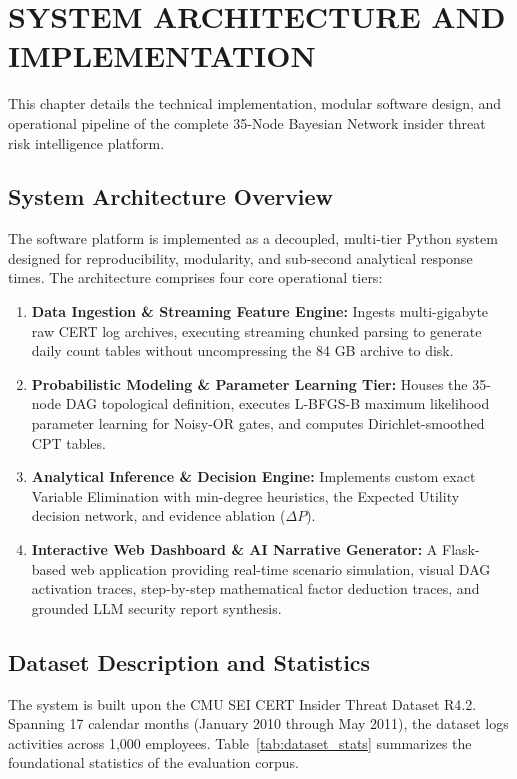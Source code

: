 \documentclass[12pt,a4paper]{report}
\begin{document}
\chapter{SYSTEM ARCHITECTURE AND IMPLEMENTATION}

This chapter details the technical implementation, modular software design, and operational pipeline of the complete 35-Node Bayesian Network insider threat risk intelligence platform.

\section{System Architecture Overview}
The software platform is implemented as a decoupled, multi-tier Python system designed for reproducibility, modularity, and sub-second analytical response times. The architecture comprises four core operational tiers:
\begin{enumerate}
    \item \textbf{Data Ingestion \& Streaming Feature Engine:} Ingests multi-gigabyte raw CERT log archives, executing streaming chunked parsing to generate daily count tables without uncompressing the 84 GB archive to disk.
    \item \textbf{Probabilistic Modeling \& Parameter Learning Tier:} Houses the 35-node DAG topological definition, executes L-BFGS-B maximum likelihood parameter learning for Noisy-OR gates, and computes Dirichlet-smoothed CPT tables.
    \item \textbf{Analytical Inference \& Decision Engine:} Implements custom exact Variable Elimination with min-degree heuristics, the Expected Utility decision network, and evidence ablation ($\Delta P$).
    \item \textbf{Interactive Web Dashboard \& AI Narrative Generator:} A Flask-based web application providing real-time scenario simulation, visual DAG activation traces, step-by-step mathematical factor deduction traces, and grounded LLM security report synthesis.
\end{enumerate}

\section{Dataset Description and Statistics}
The system is built upon the CMU SEI CERT Insider Threat Dataset R4.2. Spanning 17 calendar months (January 2010 through May 2011), the dataset logs activities across 1,000 employees. Table~\ref{tab:dataset_stats} summarizes the foundational statistics of the evaluation corpus.
\end{document}
